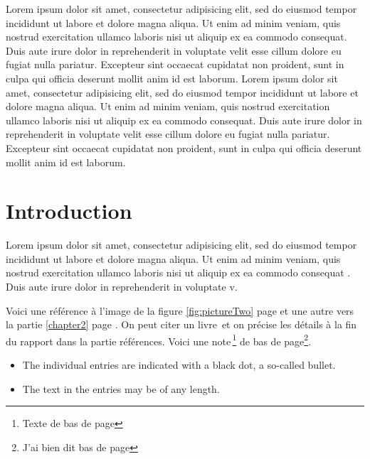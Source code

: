 \documentclass[a4paper, oneside]{report}
\begin{document}
Lorem ipsum dolor sit amet, consectetur adipisicing elit, sed do eiusmod
tempor incididunt ut labore et dolore magna aliqua. Ut enim ad minim veniam,
quis nostrud exercitation ullamco laboris nisi ut aliquip ex ea commodo
consequat. Duis aute irure dolor in reprehenderit in voluptate velit esse \cite{caillois1}
cillum dolore eu fugiat nulla pariatur. Excepteur sint occaecat cupidatat non
proident, sunt in culpa qui officia deserunt mollit anim id est laborum. Lorem ipsum dolor sit amet, consectetur adipisicing elit, sed do eiusmod
tempor incididunt ut labore et dolore magna aliqua. Ut enim ad minim veniam,
quis nostrud exercitation ullamco laboris nisi ut aliquip ex ea commodo
consequat. Duis aute irure dolor in reprehenderit in voluptate velit esse
cillum dolore eu fugiat nulla pariatur. Excepteur sint occaecat cupidatat non
proident, sunt in culpa qui officia deserunt mollit anim id est laborum.





\chapter*{Introduction}
\label{chap:general_intorduction}
%
%


Lorem ipsum dolor sit amet, consectetur adipisicing elit, sed do eiusmod
tempor incididunt ut labore \cite{jenkins2004} et dolore magna aliqua. Ut enim ad minim veniam,
quis nostrud exercitation ullamco laboris nisi ut aliquip ex ea commodo
consequat \cite{hui}. Duis aute irure dolor in reprehenderit in voluptate v.


Voici une référence à l'image de la figure \ref{fig:pictureTwo} page \pageref{fig:pictureTwo} et une autre vers la partie \ref{chapter2} page \pageref{chapter2}.
On peut citer un livre\, \cite{caillois1} et on précise les détails à la fin du rapport dans la partie références.
Voici une note\,\footnote{Texte de bas de page} de bas de page\footnote{J'ai bien dit bas de page}.


\begin{itemize}
  \item The individual entries are indicated with a black dot, a so-called bullet.
  \item The text in the entries may be of any length.
\end{itemize}
\end{document}
